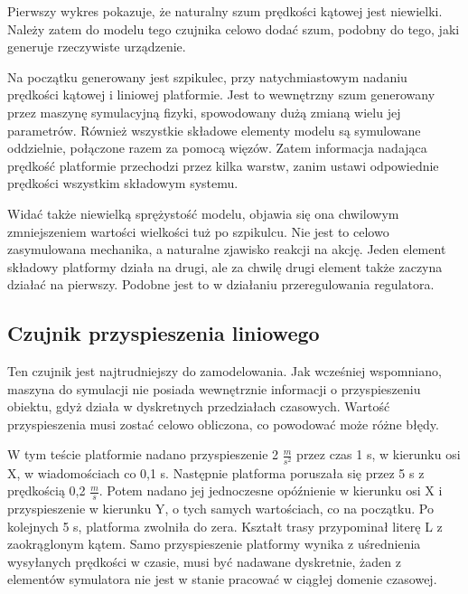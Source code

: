		Pierwszy wykres pokazuje, że naturalny szum prędkości kątowej jest niewielki. Należy zatem do modelu tego czujnika celowo dodać szum, podobny do tego, 
		jaki generuje rzeczywiste urządzenie.
		
		Na początku generowany jest szpikulec, przy natychmiastowym nadaniu prędkości kątowej i liniowej platformie.
		Jest to wewnętrzny szum generowany przez maszynę symulacyjną fizyki, spowodowany dużą zmianą wielu jej parametrów.
		Również wszystkie składowe elementy modelu są symulowane oddzielnie, połączone razem za pomocą więzów.
		Zatem informacja nadająca prędkość platformie przechodzi przez kilka warstw, zanim ustawi odpowiednie prędkości wszystkim składowym systemu.
		
		Widać także niewielką sprężystość modelu, objawia się ona chwilowym zmniejszeniem wartości wielkości tuż po szpikulcu.
		Nie jest to celowo zasymulowana mechanika, a naturalne zjawisko reakcji na akcję. Jeden element składowy platformy działa na drugi, ale za chwilę drugi element także
		zaczyna działać na pierwszy. Podobne jest to w działaniu przeregulowania regulatora.
		
	\subsection{Czujnik przyspieszenia liniowego}
		Ten czujnik jest najtrudniejszy do zamodelowania.
		Jak wcześniej wspomniano, maszyna do symulacji nie posiada wewnętrznie informacji o przyspieszeniu obiektu, gdyż działa w dyskretnych przedziałach czasowych.
		Wartość przyspieszenia musi zostać celowo obliczona, co powodować może różne błędy.
		
		W tym teście platformie nadano przyspieszenie 2 $\frac{m}{s^2}$ przez czas 1 s, w kierunku osi X, w wiadomościach co 0,1 s.
		Następnie platforma poruszała się przez 5 s z prędkością 0,2 $\frac{m}{s}$.
		Potem nadano jej jednoczesne opóźnienie w kierunku osi X i przyspieszenie w kierunku Y, o tych samych wartościach, co na początku.
		Po kolejnych 5 s, platforma zwolniła do zera. Kształt trasy przypominał literę L z zaokrąglonym kątem.
		Samo przyspieszenie platformy wynika z uśrednienia wysyłanych prędkości w czasie, musi być nadawane dyskretnie, żaden z elementów symulatora nie jest w stanie
		pracować w ciągłej domenie czasowej.
		
